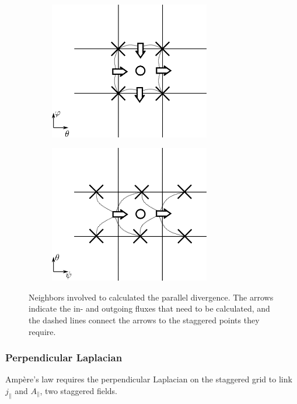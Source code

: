\begin{figure}[H]
	\centering
	\begin{subfigure}[t]{0.48\textwidth}
		\centering
		\includegraphics[height=60mm]{schemes/DivStencil_ThetaPhi.jpg}
		\label{fig:Impl_DivPara_ThetaPhi}
	\end{subfigure}
	\begin{subfigure}[t]{0.48\textwidth}
		\centering
		\includegraphics[height=60mm]{schemes/DivStencil_PsiTheta.jpg}
		\label{fig:Impl_DivPara_PsiTheta}
	\end{subfigure}
	\caption[Neighbors involved to calculated the parallel divergence]{Neighbors involved to calculated the parallel divergence. The arrows indicate the in- and outgoing fluxes that need to be calculated, and the dashed lines connect the arrows to the staggered points they require.}
	\label{fig:Impl_DivPara}
\end{figure}



\subsubsection{Perpendicular Laplacian}

Ampère's law requires the perpendicular Laplacian on the staggered grid to link $j_\parallel$ and $A_\parallel$, two staggered fields.

